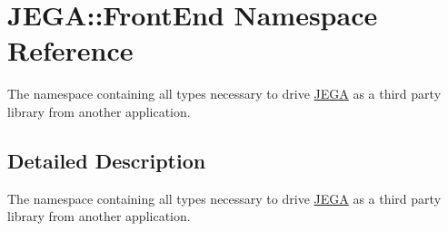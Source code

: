 \hypertarget{namespaceJEGA_1_1FrontEnd}{}\section{J\+E\+GA\+:\+:Front\+End Namespace Reference}
\label{namespaceJEGA_1_1FrontEnd}


The namespace containing all types necessary to drive \hyperlink{namespaceJEGA}{J\+E\+GA} as a third party library from another application.  




\subsection{Detailed Description}
The namespace containing all types necessary to drive \hyperlink{namespaceJEGA}{J\+E\+GA} as a third party library from another application. 
